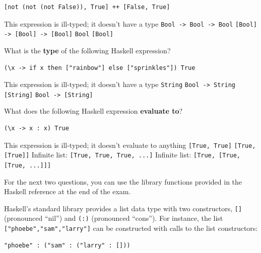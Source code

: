 \documentclass[addpoints,answers]{exam}
\begin{document}
\begin{questions}
\begin{verbatim}
[not (not (not False)), True] ++ [False, True]
\end{verbatim}

\begin{checkboxes}
  \choice This expression is ill-typed; it doesn't have a type
  \choice \verb|Bool -> Bool -> Bool|
  \choice \verb|[Bool] -> [Bool] -> [Bool]|
  \choice \verb|Bool|
  \CorrectChoice \verb|[Bool]|
\end{checkboxes}

\question[6] What is the \textbf{type} of the following Haskell expression?

\begin{verbatim}
(\x -> if x then ["rainbow"] else ["sprinkles"]) True
\end{verbatim}

\begin{checkboxes}
  \choice This expression is ill-typed; it doesn't have a type
  \choice \verb|String|
  \choice \verb|Bool -> String|
  \CorrectChoice \verb|[String]|
  \choice \verb|Bool -> [String]|
\end{checkboxes}

\question[6] What does the following Haskell expression \textbf{evaluate to}?

\begin{verbatim}
(\x -> x : x) True
\end{verbatim}

\begin{checkboxes}
  \CorrectChoice This expression is ill-typed; it doesn't evaluate to anything
  \choice \verb|[True, True]|
  \choice \verb|[True, [True]]|
  \choice Infinite list: \verb|[True, True, True, ...]|
  \choice Infinite list: \verb|[True, [True, [True, ...]]]|
\end{checkboxes}

\newpage

For the next two questions, you can use the library functions provided in the Haskell reference at the end of the exam.

Haskell's standard library provides a list data type with two constructors, \verb|[]| (pronounced ``nil'') and \verb|(:)| (pronounced ``cons'').  For instance, the list \verb|["phoebe","sam","larry"]| can be constructed with calls to the list constructors:

\begin{verbatim}
"phoebe" : ("sam" : ("larry" : []))
\end{verbatim}


\end{questions}
\end{document}
